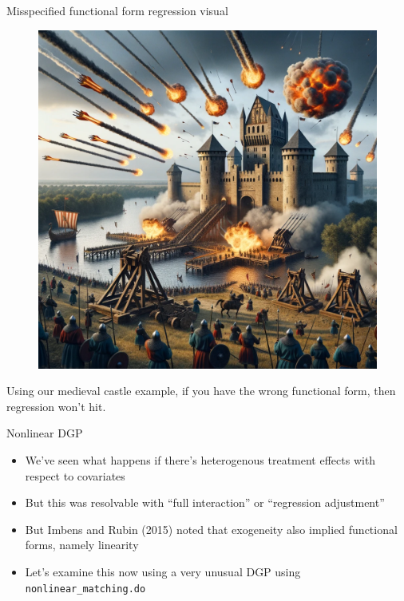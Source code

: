 \documentclass{beamer}
\begin{document}
\begin{frame}{Misspecified functional form regression visual}

  \begin{figure}
    \includegraphics[scale=0.17]{./lecture_includes/regression_linearity.png}
  \end{figure}
  
Using our medieval castle example, if you have the wrong functional form, then regression won't hit.

\end{frame}


\begin{frame}{Nonlinear DGP}

\begin{itemize}

\item We've seen what happens if there's heterogenous treatment effects with respect to covariates
\item But this was resolvable with ``full interaction'' or ``regression adjustment''
\item But Imbens and Rubin (2015) noted that exogeneity also implied functional forms, namely linearity
\item Let's examine this now using a very unusual DGP using \texttt{nonlinear\_matching.do}

\end{itemize}

\end{frame}
\end{document}
